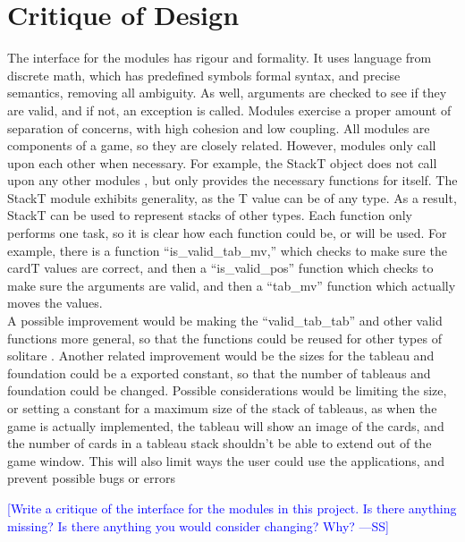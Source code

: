 \documentclass[12pt]{article}
\newcommand{\authornote}[3]{\textcolor{#1}{[#3 ---#2]}}
\newcommand{\authornote}[3]{}
\newcommand{\wss}[1]{\authornote{blue}{SS}{#1}}
\begin{document}
\newpage

\section*{Critique of Design}

The interface for the modules has rigour and formality. It uses language from discrete math, which has predefined symbols formal syntax, and precise semantics, removing all ambiguity. As well, arguments are checked to see if they are valid, and if not, an exception is called. Modules exercise a proper amount of separation of concerns, with high cohesion and low coupling. All modules are components of a game, so they are closely related. However, modules only call upon each other when necessary. For example, the StackT object does not call upon any other modules , but only provides the necessary functions for itself. The StackT module exhibits generality, as the T value can be of any type. As a result, StackT can be used to represent stacks of other types. Each function only performs one task, so it is clear how each function could be, or will be used. For example, there is a function ``is\_valid\_tab\_mv,'' which checks to make sure the cardT values are correct, and then a ``is\_valid\_pos'' function which checks to make sure the arguments are valid, and then a ``tab\_mv'' function which actually moves the values. \\

 A possible improvement would be making the ``valid\_tab\_tab'' and other valid functions more general, so that the functions could be reused for other types of solitare . Another related improvement would be the sizes for the tableau and foundation could be a exported constant, so that the number of tableaus and foundation could be changed. Possible considerations would be limiting the size, or setting a constant for a maximum size of the stack of tableaus, as when the game is actually implemented, the tableau will show an image of the cards, and the number of cards in a tableau stack shouldn't be able to extend out of the game window. This will also limit ways the user could use the applications, and prevent possible bugs or errors

\wss{Write a critique of the interface for the modules in this project.  Is there
anything missing?  Is there anything you would consider changing?  Why?}\\
\end{document}
